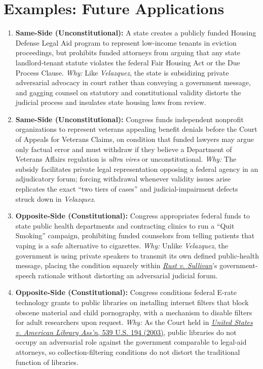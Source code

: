 \documentclass[12pt]{article}
\begin{document}
\section{Examples: Future Applications}
\begin{enumerate}
\item \textbf{Same-Side (Unconstitutional):} A state creates a publicly funded Housing Defense Legal Aid program to represent low-income tenants in eviction proceedings, but prohibits funded attorneys from arguing that any state landlord-tenant statute violates the federal Fair Housing Act or the Due Process Clause. \textit{Why:} Like \textit{Velazquez}, the state is subsidizing private adversarial advocacy in court rather than conveying a government message, and gagging counsel on statutory and constitutional validity distorts the judicial process and insulates state housing laws from review.
\item \textbf{Same-Side (Unconstitutional):} Congress funds independent nonprofit organizations to represent veterans appealing benefit denials before the Court of Appeals for Veterans Claims, on condition that funded lawyers may argue only factual error and must withdraw if they believe a Department of Veterans Affairs regulation is \textit{ultra vires} or unconstitutional. \textit{Why:} The subsidy facilitates private legal representation opposing a federal agency in an adjudicatory forum; forcing withdrawal whenever validity issues arise replicates the exact ``two tiers of cases'' and judicial-impairment defects struck down in \textit{Velazquez}.
\item \textbf{Opposite-Side (Constitutional):} Congress appropriates federal funds to state public health departments and contracting clinics to run a ``Quit Smoking'' campaign, prohibiting funded counselors from telling patients that vaping is a safe alternative to cigarettes. \textit{Why:} Unlike \textit{Velazquez}, the government is using private speakers to transmit its own defined public-health message, placing the condition squarely within \href{https://supreme.justia.com/cases/federal/us/500/173/}{\textit{Rust v. Sullivan}}'s government-speech rationale without distorting an adversarial judicial forum.
\item \textbf{Opposite-Side (Constitutional):} Congress conditions federal E-rate technology grants to public libraries on installing internet filters that block obscene material and child pornography, with a mechanism to disable filters for adult researchers upon request. \textit{Why:} As the Court held in \href{https://supreme.justia.com/cases/federal/us/539/194/}{\textit{United States v. American Library Ass'n}, 539 U.S. 194 (2003)}, public libraries do not occupy an adversarial role against the government comparable to legal-aid attorneys, so collection-filtering conditions do not distort the traditional function of libraries.

\end{enumerate}
\end{document}
